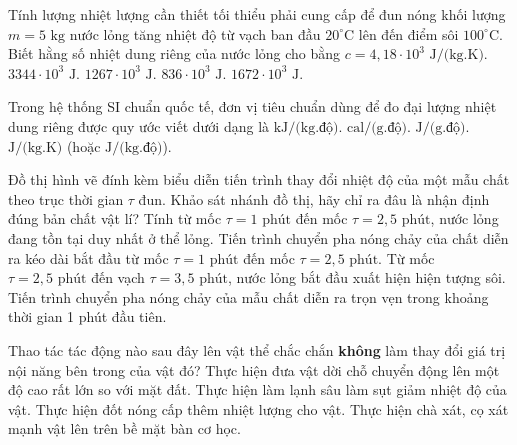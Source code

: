 \begin{ex}%
	Tính lượng nhiệt lượng cần thiết tối thiểu phải cung cấp để đun nóng khối lượng $m = 5\text{ kg}$ nước lỏng tăng nhiệt độ từ vạch ban đầu $20^\circ\text{C}$ lên đến điểm sôi $100^\circ\text{C}$. Biết hằng số nhiệt dung riêng của nước lỏng cho bằng $c = 4,18 \cdot 10^{3}\text{ J/(kg.K)}$.
	\choice
	{$3344 \cdot 10^{3}\text{ J}$.}
	{$1267 \cdot 10^{3}\text{ J}$.}
	{$836 \cdot 10^{3}\text{ J}$.}
	{\True $1672 \cdot 10^{3}\text{ J}$.}
\end{ex}

\begin{ex}%
	Trong hệ thống SI chuẩn quốc tế, đơn vị tiêu chuẩn dùng để đo đại lượng nhiệt dung riêng được quy ước viết dưới dạng là
	\choice
	{$\text{kJ/(kg.độ)}$.}
	{$\text{cal/(g.độ)}$.}
	{$\text{J/(g.độ)}$.}
	{\True $\text{J/(kg.K)}$ (hoặc $\text{J/(kg.độ)}$).}
\end{ex}

\begin{ex}%
	Đồ thị hình vẽ đính kèm biểu diễn tiến trình thay đổi nhiệt độ của một mẫu chất theo trục thời gian $\tau$ đun. Khảo sát nhánh đồ thị, hãy chỉ ra đâu là nhận định đúng bản chất vật lí?
	\choice
	{Tính từ mốc $\tau = 1\text{ phút}$ đến mốc $\tau = 2,5\text{ phút}$, nước lỏng đang tồn tại duy nhất ở thể lỏng.}
	{\True Tiến trình chuyển pha nóng chảy của chất diễn ra kéo dài bắt đầu từ mốc $\tau = 1\text{ phút}$ đến mốc $\tau = 2,5\text{ phút}$.}
	{Từ mốc $\tau = 2,5\text{ phút}$ đến vạch $\tau = 3,5\text{ phút}$, nước lỏng bắt đầu xuất hiện hiện tượng sôi.}
	{Tiến trình chuyển pha nóng chảy của mẫu chất diễn ra trọn vẹn trong khoảng thời gian 1 phút đầu tiên.}
\end{ex}

\begin{ex}%
	Thao tác tác động nào sau đây lên vật thể chắc chắn \textbf{không} làm thay đổi giá trị nội năng bên trong của vật đó?
	\choice
	{\True Thực hiện đưa vật dời chỗ chuyển động lên một độ cao rất lớn so với mặt đất.}
	{Thực hiện làm lạnh sâu làm sụt giảm nhiệt độ của vật.}
	{Thực hiện đốt nóng cấp thêm nhiệt lượng cho vật.}
	{Thực hiện chà xát, cọ xát mạnh vật lên trên bề mặt bàn cơ học.}
\end{ex}

